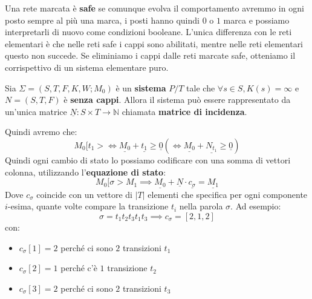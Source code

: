 Una rete marcata è \textbf{safe} se comunque evolva il comportamento avremmo in
ogni posto sempre al più una marca, i posti hanno quindi $0$ o $1$ marca e possiamo
interpretarli di nuovo come condizioni booleane. L'unica differenza con le reti
elementari è che nelle reti safe i cappi sono abilitati, mentre nelle reti
elementari questo non succede. Se eliminiamo i cappi dalle reti marcate safe,
otteniamo il corrispettivo di un sistema elementare puro.
\begin{definizione}
    Sia $\Sigma = (S,T,F,K,W;M_0)$ è un \textbf{sistema} $P/T$ tale che
    $\forall s\in S,K(s)=\infty$ e $N=(S,T,F)$ è \textbf{senza cappi}. Allora il
    sistema può essere rappresentato da un'unica matrice $\underline{N}:S\times
        T\rightarrow\mathbb{N}$
    chiamata \textbf{matrice di incidenza}.
\end{definizione}
Quindi avremo che:
\begin{equation}
    M_0[t_1>\iff \underline{M_0}+\underline{t_1}\ge \underline{0} (\iff
    \underline{M_0}+\underline{N_{t_1}}\ge \underline{0})
\end{equation}
Quindi ogni cambio di stato lo possiamo codificare con una somma di vettori colonna,
utilizzando l'\textbf{equazione di stato}:
\begin{equation}
    M_0[\sigma>M_1\implies \underline{M_0}+\underline{N}\cdot \underline{c_\sigma}
    =\underline{M_1}
\end{equation}
Dove $c_\sigma$ coincide con un vettore di $|T|$ elementi che specifica per ogni
componente $i$-esima, quante volte compare la transizione $t_i$ nella parola $\sigma$.
Ad esempio:
\begin{equation*}
    \sigma = t_1t_2t_3t_1t_3 \implies c_\sigma = \left[2, 1, 2\right]
\end{equation*}
con:
\begin{itemize}
    \item $c_\sigma [1]= 2$ perché ci sono $2$ transizioni $t_1$
    \item $c_\sigma [2]= 1$ perché c'è $1$ transizione $t_2$
    \item $c_\sigma [3]= 2$ perché ci sono $2$ transizioni $t_3$
\end{itemize}

